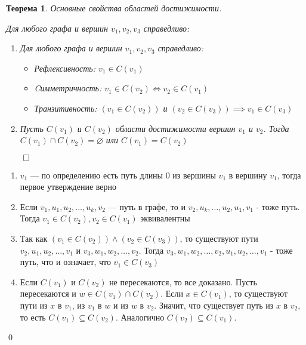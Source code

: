 \documentclass[a4paper,12pt,leqno]{article}
\theoremstyle{plain} %
\newtheorem{theorem}{Теорема}
\theoremstyle{definition} %
\renewenvironment{proof}{$\qed$}{{\qed}} %
\begin{document}
\begin{theorem}\textit{Основные свойства областей достижимости.}

Для любого графа и вершин $v_1, v_2, v_3$ справедливо:

\begin{enumerate}
    \item Для любого графа и вершин $v_1, v_2, v_3$ справедливо:
    
    \begin{itemize}
        \item Рефлексивность: $v_1 \in C(v_1)$
    
        \item Cимметричность: $v_1 \in C(v_2) \iff v_2 \in C(v_1)$
    
        \item Транзитивность: $\left( v_1 \in C(v_2) \right)$ и $\left( v_2 \in C(v_3) \right) \implies v_1 \in C(v_3)$
    \end{itemize}

    \item Пусть $C(v_1)$ и $C(v_2)$ области достижимости вершин $v_1$ и $v_2$. Тогда $C(v_1) \cap C(v_2) = \varnothing$ или $C(v_1) = C(v_2)$
\end{enumerate}

\end{theorem}

\begin{proof}

\begin{enumerate}

    \item  $v_1$ ---  по определению есть путь длины 0 из вершины $v_1$ в вершину $v_1$, тогда первое утверждение верно
    \item Если $v_1, u_1, u_2, \dots, u_k, v_2$ --- путь в графе, то и $v_2, u_k, \dots, u_2, u_1, v_1$ - тоже путь. Тогда $v_1 \in C(v_2), v_2 \in C(v_1)$ эквивалентны
    \item Так как $\left( v_1 \in C(v_2) \right) \wedge \left( v_2 \in C(v_3) \right)$, то существуют пути $v_2, u_1, u_2, \dots, v_1$ и $v_3, w_1, w_2, \dots, v_2$. Тогда $v_3, w_1, w_2, \dots, v_2, u_1, u_2, \dots, v_1 $ - тоже путь, что и означает, что $v_1 \in C(v_3)$
    
    \item Если $C(v_1)$ и $C(v_2)$ не пересекаются, то все доказано. Пусть пересекаются и $w \in C(v_1) \cap C(v_2)$. Если $x \in C(v_1)$, то существуют пути из $x$ в $v_1$, из $v_1$ в $w$ и из $w$ в $v_2$. Значит, что существует путь из $x$ в $v_2$, то есть $C(v_1) \subseteq C(v_2)$. Аналогично $C(v_2) \subseteq C(v_1)$. 
\end{enumerate}

\end{proof}
\end{document}
